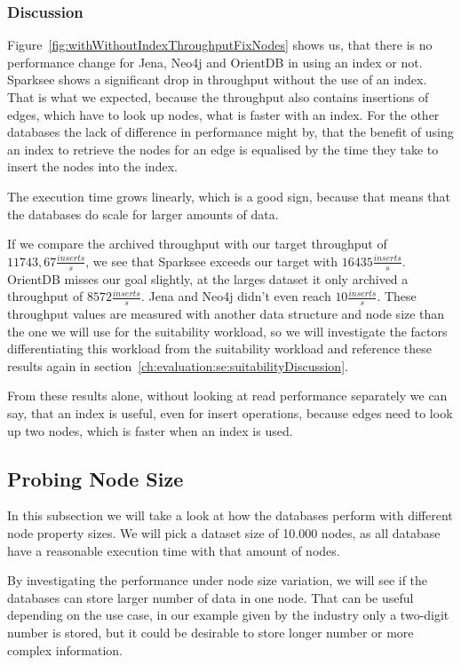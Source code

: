 \subsubsection{Discussion}
Figure~\ref{fig:withWithoutIndexThroughputFixNodes} shows us,
that there is no performance change for Jena, Neo4j and OrientDB in using an index or not.
Sparksee shows a significant drop in throughput without the use of an index.
That is what we expected,
because the throughput also contains insertions of edges,
which have to look up nodes,
what is faster with an index.
For the other databases the lack of difference in performance might by,
that the benefit of using an index to retrieve the nodes for an edge is equalised by the time they take to insert the nodes into the index.

The execution time grows linearly,
which is a good sign,
because that means that the databases do scale for larger amounts of data.

If we compare the archived throughput with our target throughput of $ 11743,67 \frac{inserts}{s} $,
we see that Sparksee exceeds our target with $ 16435 \frac{inserts}{s} $.
OrientDB misses our goal slightly,
at the larges dataset it only archived a throughput of $ 8572 \frac{inserts}{s} $.
Jena and Neo4j didn't even reach $ 10 \frac{inserts}{s} $.
These throughput values are measured with another data structure and node size than the one we will use for the suitability workload,
so we will investigate the factors differentiating this workload from the suitability workload and reference these results again in section~\ref{ch:evaluation:se:suitabilityDiscussion}.

From these results alone,
without looking at read performance separately we can say,
that an index is useful,
even for insert operations,
because edges need to look up two nodes,
which is faster when an index is used.

\subsection{Probing Node Size}
\label{ch:evaluation:se:probingNodeSize}
In this subsection we will take a look at how the databases perform with different node property sizes.
We will pick a dataset size of 10.000 nodes,
as all database have a reasonable execution time with that amount of nodes.

By investigating the performance under node size variation,
we will see if the databases can store larger number of data in one node.
That can be useful depending on the use case,
in our example given by the industry only a two-digit number is stored,
but it could be desirable to store longer number or more complex information.

